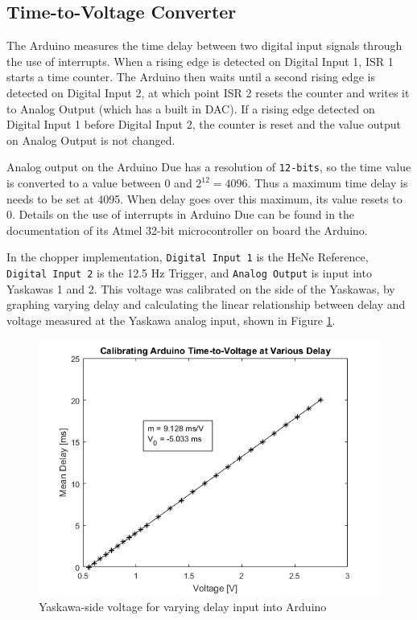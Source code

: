 \documentclass{article}
\begin{document}
        \subsection{Time-to-Voltage Converter} \label{arduino_vtt}
        
        The Arduino measures the time delay between two digital input signals through the use of interrupts. When a rising edge is detected on Digital Input 1, ISR 1 starts a time counter. The Arduino then waits until a second rising edge is detected on Digital Input 2, at which point ISR 2 resets the counter and writes it to Analog Output (which has a built in DAC). If a rising edge detected on Digital Input 1 before Digital Input 2, the counter is reset and the value output on Analog Output is not changed.
        
        Analog output on the Arduino Due has a resolution of \texttt{12-bits}, so the time value is converted to a value between 0 and $2^{12}=4096$. Thus a maximum time delay is needs to be set at 4095. When delay goes over this maximum, its value resets to 0. Details on the use of interrupts in Arduino Due can be found in the documentation of its Atmel 32-bit microcontroller \cite{atmel_sam3x_series} on board the Arduino. 
        
        In the chopper implementation, \texttt{Digital Input 1} is the HeNe Reference, \texttt{Digital Input 2} is the 12.5 Hz Trigger, and \texttt{Analog Output} is input into Yaskawas 1 and 2. This voltage was calibrated on the side of the Yaskawas, by graphing varying delay and calculating the linear relationship between delay and voltage measured at the Yaskawa analog input, shown in Figure \ref{fig:arduino-yaskawa_calibration}.
        
        \begin{figure}[h]
            \centering
            \includegraphics[scale=0.6]{img/arduino-yaskawa_calibration}
            \caption{Yaskawa-side voltage for varying delay input into Arduino}
            \label{fig:arduino-yaskawa_calibration}
        \end{figure}
        
\end{document}
